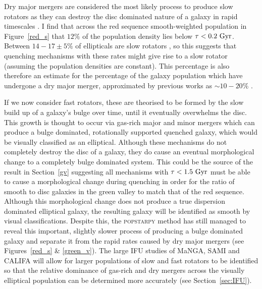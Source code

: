 Dry major mergers are considered the most likely process to produce slow rotators \citep{duc11, naab14} as they can destroy the disc dominated nature of a galaxy in rapid timescales \citep{toomre72}. I find that across the red sequence smooth-weighted population in Figure~\ref{red_s} that $12\%$ of the population density lies below $\tau <0.2~\rm{Gyr}$. Between $14-17\pm5\%$ of ellipticals are slow rotators \citep{emsellem11, stott16}, so this suggests that quenching mechanisms with these rates might give rise to a slow rotator (assuming the population densities are constant). This percentage is also therefore an estimate for the percentage of the galaxy population which have undergone a dry major merger, approximated by previous works as $\sim10-20\%$ \citep[since $z\sim1$;][]{khochfar09}.

If we now consider fast rotators, these are theorised to be formed by the slow build up of a galaxy's bulge over time, until it eventually overwhelms the disc. This growth is thought to occur via gas-rich major and minor mergers \citep{duc11} which can produce a bulge dominated, rotationally supported quenched galaxy, which would be visually classified as an elliptical. Although these mechanisms do not completely destroy the disc of a galaxy, they do cause an eventual morphological change to a completely bulge dominated system. This could be the source of the result in Section~\ref{gv} suggesting all mechanisms with $\tau < 1.5 ~\rm{Gyr}$ must be able to cause a morphological change during quenching in order for the ratio of smooth to disc galaxies in the green valley to match that of the red sequence. Although this morphological change does not produce a true dispersion dominated elliptical galaxy, the resulting galaxy will be identified as smooth by visual classifications. Despite this, the \textsc{popstarpy} method has still managed to reveal this important, slightly slower process of producing a bulge dominated galaxy and separate it from the rapid rates caused by dry major mergers (see Figures~\ref{red_s} \& \ref{green_v}). The large IFU studies of MaNGA, SAMI and CALIFA will allow for larger populations of slow and fast rotators to be identified so that the relative dominance of gas-rich and dry mergers across the visually elliptical population can be determined more accurately (see Section~\ref{sec:IFU}). 


